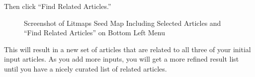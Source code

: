 \documentclass[
  letterpaper,
  DIV=11,
  numbers=noendperiod]{scrreprt}
\begin{document}
Then click ``Find Related Articles.''

\begin{figure}

\caption{\label{fig-litmaps8}Screenshot of Litmaps Seed Map Including
Selected Articles and ``Find Related Articles'' on Bottom Left Menu}


\end{figure}%

This will result in a new set of articles that are related to all three
of your initial input articles. As you add more inputs, you will get a
more refined result list until you have a nicely curated list of related
articles.
\end{document}
